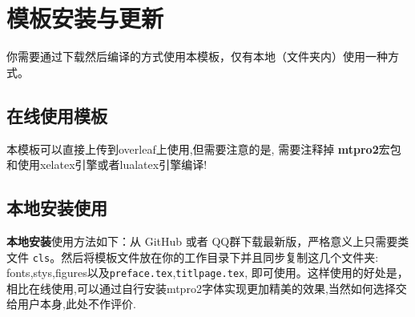 \documentclass{Beautybook-V6.1}
\begin{document}
\section{模板安装与更新}

你需要通过下载然后编译的方式使用本模板，仅有本地（文件夹内）使用一种方式。

\subsection{在线使用模板}
本模板可以直接上传到overleaf上使用,但需要注意的是, 需要注释掉 \textbf{mtpro2}宏包和使用xelatex引擎或者lualatex引擎编译!

\subsection{本地安装使用}

\textbf{本地安装}使用方法如下：从 GitHub 或者 QQ群下载最新版，严格意义上只需要类文件 \lstinline{cls}。然后将模板文件放在你的工作目录下并且同步复制这几个文件夹: fonts,stys,figures以及\lstinline{preface.tex},\lstinline{titlpage.tex}, 即可使用。这样使用的好处是，相比在线使用,可以通过自行安装mtpro2字体实现更加精美的效果,当然如何选择交给用户本身,此处不作评价. 
\end{document}
